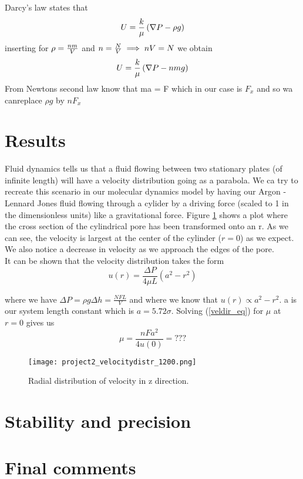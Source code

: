 \documentclass[a4paper,english, 10pt, twoside]{article}
\begin{document}
Darcy's law states that
$$
U = {k\over\mu}\left(\nabla P - \rho g\right)
$$
inserting for $\rho = {nm\over V}$ and $n = {N\over V}\implies nV = N$ we obtain
$$
U = {k\over\mu}\left(\nabla P - nmg\right)
$$
From Newtons second law know that ma = F which in our case is $F_x$ and so wa canreplace $\rho g$ by 
$nF_x$ 

\section{Results}

Fluid dynamics tells us that a fluid flowing between two stationary plates (of infinite length) will have a 
velocity distribution going as a parabola. We ca try to recreate this scenario in our molecular dynamics model 
by having our Argon - Lennard Jones fluid flowing through a cylider by a driving force (scaled to 1 in the 
dimensionless units) like a gravitational force. Figure \ref{veldir1} shows a plot where the cross section of 
the cylindrical pore has been transformed onto an r. As we can see, the velocity is largest at the center of the 
cylinder ($r=0$) as we expect. We also notice a decrease in velocity as we approach the edges of the pore.\\
It can be shown that the velocity distribution takes the form 
\begin{equation}\label{veldir_eq}
 u(r) = \frac{\Delta P}{4\mu L}\left(a^2-r^2\right)
\end{equation}

where we have $\Delta P = \rho g \Delta h = \frac{NFL}{V}$ and where we know that $u(r) \propto a^2-r^2$. a 
is our system length constant which is $a = 5.72\sigma$. Solving (\ref{veldir_eq}) for $\mu$ at $r=0$ gives us 
$$
\mu = \frac{nFa^2}{4u(0)} = ???
$$
\begin{figure}[H]
\centering
 \texttt{[image: project2\_velocitydistr\_1200.png]}
 \caption{Radial distribution of velocity in z direction.}
 \label{veldir1}
\end{figure}


\section{Stability and precision}

\section{Final comments}

% 
% 
% 
\end{document}
